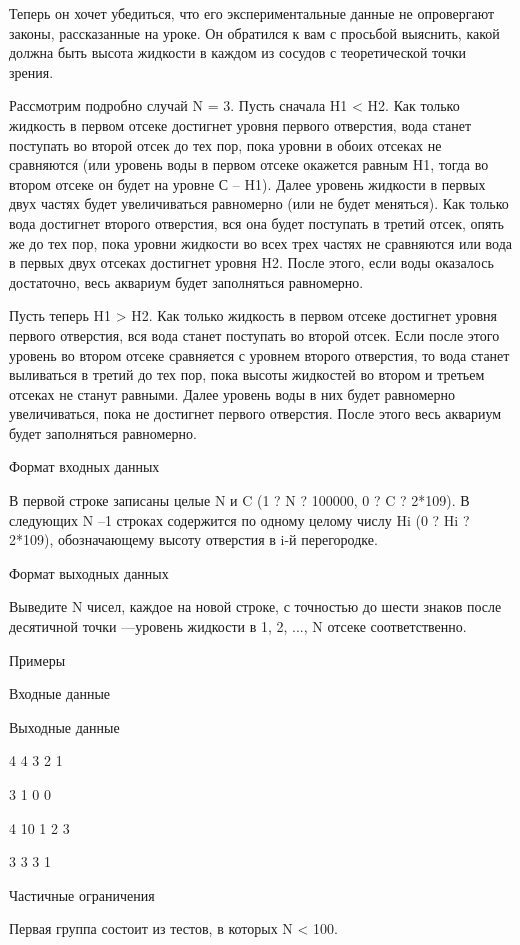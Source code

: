 \documentclass[]{article}
\begin{document}
Теперь он хочет убедиться, что его экспериментальные данные не опровергают законы, рассказанные на уроке. Он обратился к вам с просьбой выяснить, какой должна быть высота жидкости в каждом из сосудов с теоретической точки зрения.

Рассмотрим подробно случай N = 3. Пусть сначала H1 < H2. Как только жидкость в первом отсеке достигнет уровня первого отверстия, вода станет поступать во второй отсек до тех пор, пока уровни в обоих отсеках не сравняются (или уровень воды в первом отсеке окажется равным H1, тогда во втором отсеке он будет на уровне С – H1). Далее уровень жидкости в первых двух частях будет увеличиваться равномерно (или не будет меняться). Как только вода достигнет второго отверстия, вся она будет поступать в третий отсек, опять же до тех пор, пока уровни жидкости во всех трех частях не сравняются или вода в первых двух отсеках достигнет уровня H2. После этого, если воды оказалось достаточно, весь аквариум будет заполняться равномерно.

Пусть теперь H1 > H2. Как только жидкость в первом отсеке достигнет уровня первого отверстия, вся вода станет поступать во второй отсек. Если после этого уровень во втором отсеке сравняется с уровнем второго отверстия, то вода станет выливаться в третий до тех пор, пока высоты жидкостей во втором и третьем отсеках не станут равными. Далее уровень воды в них будет равномерно увеличиваться, пока не достигнет первого отверстия. После этого весь аквариум будет заполняться равномерно.

Формат входных данных

В первой строке записаны целые N и C (1 ? N ? 100000, 0 ? C ? 2*109). В следующих N –1 строках содержится по одному целому числу Hi (0 ? Hi ? 2*109), обозначающему высоту отверстия в i-й перегородке.

Формат выходных данных

Выведите N чисел, каждое на новой строке, с точностью до шести знаков после десятичной точки —уровень жидкости в 1, 2, ..., N отсеке соответственно.

Примеры

Входные данные
	

Выходные данные

4 4
3
2
1
	

3
1
0
0

4 10
1
2
3
	

3
3
3
1

Частичные ограничения

Первая группа состоит из тестов, в которых N < 100.
\end{document}
